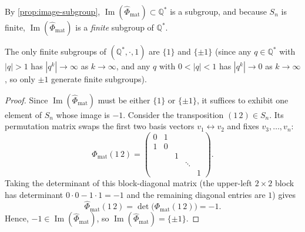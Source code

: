 \begin{content}
By \cref{prop:image-subgroup}, $\operatorname{Im}(\hat{\Phi}_{\text{mat}}) \subset \mathbb{Q}^*$ is a subgroup, and because $S_n$ is finite, $\operatorname{Im}(\hat{\Phi}_{\text{mat}})$ is a \emph{finite} subgroup of $\mathbb{Q}^*$.

The only finite subgroups of $(\mathbb{Q}^*, \cdot, 1)$ are $\{1\}$ and $\{\pm 1\}$ (since any $q \in \mathbb{Q}^*$ with $|q| > 1$ has $|q^k| \to \infty$ as $k \to \infty$, and any $q$ with $0 < |q| < 1$ has $|q^k| \to 0$ as $k \to \infty$, so only $\pm 1$ generate finite subgroups).


\begin{proof}
Since $\operatorname{Im}(\hat{\Phi}_{\text{mat}})$ must be either $\{1\}$ or $\{\pm 1\}$, it suffices to exhibit one element of $S_n$ whose image is $-1$. Consider the transposition $(1\,2) \in S_n$. Its permutation matrix swaps the first two basis vectors $v_1 \leftrightarrow v_2$ and fixes $v_3, \dots, v_n$:
\[
\Phi_{\text{mat}}(1\,2) =
\begin{pmatrix}
0 & 1 & & & \\
1 & 0 & & & \\
& & 1 & & \\
& & & \ddots & \\
& & & & 1
\end{pmatrix}.
\]
Taking the determinant of this block-diagonal matrix (the upper-left $2 \times 2$ block has determinant $0 \cdot 0 - 1 \cdot 1 = -1$ and the remaining diagonal entries are $1$) gives
\[
\hat{\Phi}_{\text{mat}}(1\,2) = \det\bigl(\Phi_{\text{mat}}(1\,2)\bigr) = -1.
\]
Hence, $-1 \in \operatorname{Im}(\hat{\Phi}_{\text{mat}})$, so $\operatorname{Im}(\hat{\Phi}_{\text{mat}}) = \{\pm 1\}$.
\end{proof}

\end{content}

